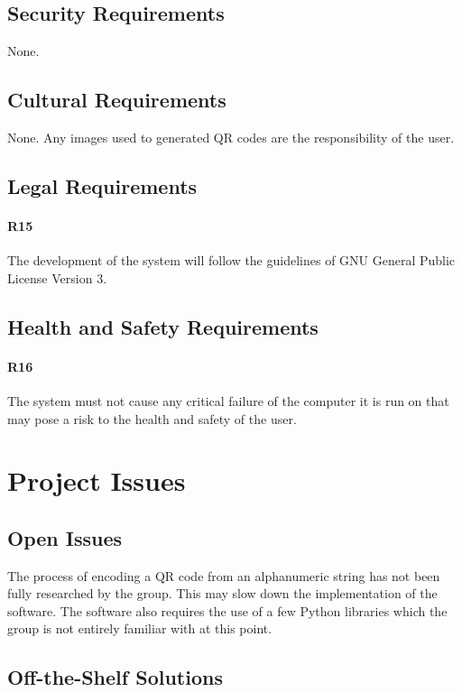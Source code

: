 \documentclass[12pt, titlepage]{article}
\begin{document}
\subsection{Security Requirements}

	None.

\subsection{Cultural Requirements}

	None. Any images used to generated QR codes are the responsibility of the 
	user.

\subsection{Legal Requirements}

	\paragraph{R15}
	The development of the system will follow the guidelines of GNU General 
	Public License Version 3.

\subsection{Health and Safety Requirements}

	\paragraph{R16}
	The system must not cause any critical failure of the computer it is run on 
	that may pose a risk to the health and safety of the user.

\section{Project Issues}

\subsection{Open Issues}

	The process of encoding a QR code from an alphanumeric string has not been 
	fully researched by the group. This may slow down the implementation of the 
	software. The software also requires the use of a few Python libraries 
	which the group is not entirely familiar with at this point.

\subsection{Off-the-Shelf Solutions}
\end{document}
